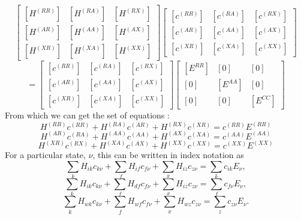 \documentclass[12pt]{article}
\begin{document}
\begin{equation*}
\begin{bmatrix}
[H^{(RR)}]&[H^{(RA)}]&[H^{(RX)}]\\
[H^{(AR)}]&[H^{(AA)}]&[H^{(AX)}]\\
[H^{(XR)}]&[H^{(XA)}]&[H^{(XX)}]
\end{bmatrix}
\begin{bmatrix}
[c^{(RR)}]&[c^{(RA)}]&[c^{(RX)}]\\
[c^{(AR)}]&[c^{(AA)}]&[c^{(AX)}]\\
[c^{(XR)}]&[c^{(XA)}]&[c^{(XX)}]
\end{bmatrix}
\end{equation*}
\begin{equation}
=
\begin{bmatrix}
[c^{(RR)}]&[c^{(RA)}]&[c^{(RX)}]\\
[c^{(AR)}]&[c^{(AA)}]&[c^{(AX)}]\\
[c^{(XR)}]&[c^{(XA)}]&[c^{(XX)}]
\end{bmatrix}
\begin{bmatrix}
[E^{RR}]& [0]& [0]\\
[0]& [E^{AA}]& [0]\\
[0]& [0]&      [E^{CC}]
\end{bmatrix}
\end{equation}
\noindent From which we can get the set of equations :
\begin{equation}
H^{(RR)}c^{(RR)}+H^{(RA)}c^{(AR)}+H^{(RX)}c^{(XR)}= c^{(RR)}E^{(RR)}
\end{equation}
\begin{equation}
H^{(AR)}c^{(RA)}+H^{(AA)}c^{(AA)}+H^{(AX)}c^{(XA)}= c^{(AA)}E^{(AA)}
\end{equation}
\begin{equation}
H^{(XR)}c^{(RX)}+H^{(XA)}c^{(AX)}+H^{(XX)}c^{(XX)}= c^{(XX)}E^{(XX)}
\end{equation}
\noindent For a particular state, $\nu$, this can be written in index notation as
\begin{equation}
\sum_{k} H_{ik}c_{k\nu}
+\sum_{f}H_{if}c_{f\nu}
+\sum_{x}H_{iz}c_{z\nu}
= \sum_{k}c_{ik}E_{\nu},
\end{equation}
\begin{equation}
\sum_{k}  H_{ik}c_{k\nu}
+\sum_{f} H_{df}c_{f\nu}
+\sum_{x} H_{iz}c_{z\nu}
= \sum_{f}c_{f\nu}E_{\nu},
\end{equation}
\begin{equation}
\sum_{k} H_{wk}c_{k\nu}
+\sum_{f}H_{wf}c_{f\nu}
+\sum_{x}H_{wz}c_{z\nu}
= \sum_{z}c_{z\nu}E_{\nu}.
\end{equation}
\end{document}
